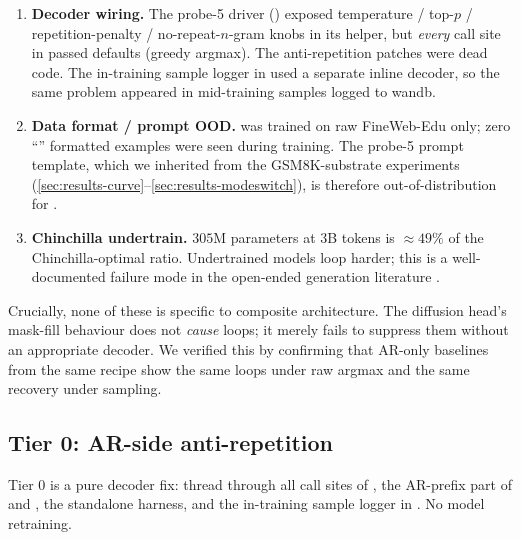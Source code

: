 \begin{enumerate}
  \item \textbf{Decoder wiring.} The probe-5 driver
        () exposed
        temperature / top-$p$ / repetition-penalty /
        no-repeat-$n$-gram knobs in its  helper, but
        \emph{every} call site in  passed defaults
        (greedy argmax). The anti-repetition patches were dead code.
        The in-training sample logger in  used a
        separate inline  decoder, so the same
        problem appeared in mid-training samples logged to wandb.
  \item \textbf{Data format / prompt OOD.}  was trained on
        raw FineWeb-Edu only; zero ``''
        formatted examples were seen during training. The probe-5
        prompt template, which we inherited from the
        GSM8K-substrate experiments
        (\textsection\ref{sec:results-curve}--\ref{sec:results-modeswitch}),
        is therefore out-of-distribution for .
  \item \textbf{Chinchilla undertrain.} $305$M parameters at $3$B
        tokens is $\approx 49\%$ of the Chinchilla-optimal ratio.
        Undertrained models loop harder; this is a well-documented
        failure mode in the open-ended generation literature
        \citep{holtzman2020curious,su2022simctg}.
\end{enumerate}

Crucially, none of these is specific to composite architecture. The
diffusion head's mask-fill behaviour does not \emph{cause} loops; it
merely fails to suppress them without an appropriate decoder. We
verified this by confirming that AR-only baselines from the same
recipe show the same loops under raw argmax and the same recovery
under sampling.

\subsection{Tier 0: AR-side anti-repetition}
\label{sec:sq-tier0}

Tier 0 is a pure decoder fix: thread
 through all call sites of ,
the AR-prefix part of  and ,
the standalone  harness, and the
in-training sample logger in . No model retraining.

